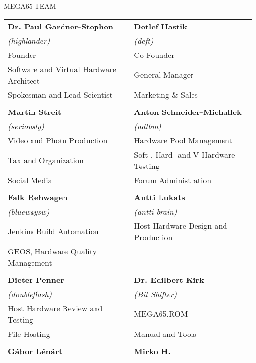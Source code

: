\newpage
{\huge MEGA65 TEAM}\vspace{1cm}

\setlength{\tabcolsep}{1mm}
\begin{tabular}{ll}

{\large\bf Dr. Paul Gardner-Stephen}    & {\large\bf Detlef Hastik} \\
\textit{(highlander)}                   & \textit{(deft)} \\
Founder                                 & Co-Founder \\
Software and Virtual Hardware Architect & General Manager \\
Spokesman and Lead Scientist            & Marketing \& Sales \\
& \\
{\large\bf Martin Streit}               & {\large\bf Anton Schneider-Michallek} \\
 \textit{(seriously)}                   & \textit{(adtbm)} \\
Video and Photo Production              & Hardware Pool Management \\
Tax and Organization                    & Soft-, Hard- and V-Hardware Testing \\
Social Media                            & Forum Administration \\
& \\
{\large\bf Falk Rehwagen}               & {\large\bf Antti Lukats} \\
 \textit{(bluewaysw)}                   & \textit{(antti-brain)} \\
Jenkins Build Automation                & Host Hardware Design and Production \\
GEOS, Hardware Quality Management       & \\
& \\
{\large\bf Dieter Penner}               & {\large\bf Dr. Edilbert Kirk} \\
 \textit{(doubleflash)}                 & \textit{(Bit Shifter)} \\
Host Hardware Review and Testing        & MEGA65.ROM \\
File Hosting                            & Manual and Tools \\
& \\
{\large\bf Gábor Lénárt}                & {\large\bf Mirko H.} \\

\end{tabular}
